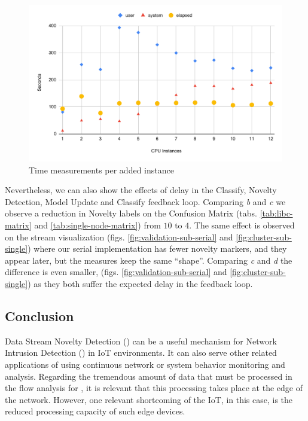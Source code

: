\begin{figure}[hbt]
  \centering
  \includegraphics[width=\whencolumns{0.6}{1}\linewidth,page=1]{experiments/speedup-clean.pdf}
  \caption{Time measurements per added instance}
  \label{fig:speedup}
\end{figure}

Nevertheless, we can also show the effects of delay in the
Classify, Novelty Detection, Model Update and Classify feedback loop.
Comparing \emph{b} and \emph{c} we observe a reduction in Novelty labels
on the Confusion Matrix (tabs. \ref{tab:libc-matrix} and \ref{tab:single-node-matrix})
from $10$ to $4$.
The same effect is observed on the stream visualization (figs.
\ref{fig:validation-sub-serial} and \ref{fig:cluster-sub-single}) where our
serial implementation has fewer novelty markers, and they appear later, but the
measures keep the same ``shape''.
Comparing \emph{c} and \emph{d} the difference is even smaller,
(figs. \ref{fig:validation-sub-serial} and \ref{fig:cluster-sub-single})
as they both suffer the expected delay in the feedback loop.

\subsection{Conclusion} 
\label{sec:conclusion}

Data Stream Novelty Detection (\nd) can be a useful mechanism for Network
Intrusion Detection (\nids) in IoT environments. It can also serve other related applications of \nd using continuous
network or system behavior monitoring and analysis.
Regarding the tremendous amount of data that must be processed in the flow analysis for \nd, it 
is relevant that this processing takes place at the edge of the network. 
However, one relevant shortcoming of the IoT, in this case, is the reduced processing capacity of such edge devices. 

